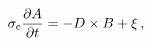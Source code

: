 \begin{equation}
\sigma_\mathrm{c} {\partial A\over\partial t} = - D \times B + \xi\, ,
\label{eq37}
\end{equation}

